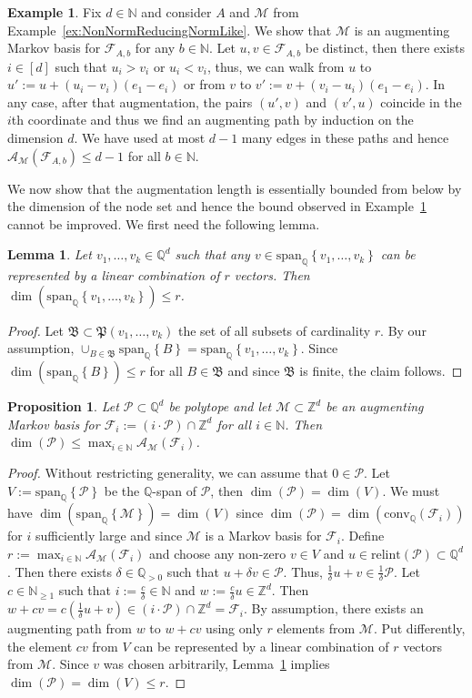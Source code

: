 \documentclass[11pt]{amsart}
\newtheorem{lemma}[thm]{Lemma}
\newtheorem{prop}[thm]{Proposition}
\theoremstyle{definition}
\newtheorem{example}[thm]{Example}
\numberwithin{equation}{section}
\newcommand{\ring}[1]{\ensuremath{\mathbb{#1}}}
\renewcommand{\>}{\rangle}
\newcommand{\<}{\langle}
\newcommand{\0}{\mathbf{0}}
\newcommand{\1}{\mathbf{1}}
\newcommand{\2}{\mathbf{2}}
\newcommand\NN{\ring{N}}
\newcommand\QQ{\ring{Q}}
\newcommand\ZZ{\ring{Z}}
\newcommand\cA{{\mathcal A}}
\newcommand\cF{{\mathcal F}}
\newcommand\cM{{\mathcal M}}
\newcommand\cP{{\mathcal P}}
\newcommand{\fiber}[2]{\mathcal{F}_{#1,#2}}
\newcommand{\auglen}[2]{\cA_{#1}(#2)}
\newcommand{\conv}[1]{\mathrm{conv}_\QQ(#1)}
\newcommand{\spannQQ}[1]{\mathrm{span}_\QQ\left\{#1\right\}}
\begin{document}
\begin{example}\label{ex:AugmentingMarkovBasis}
Fix $d\in\NN$ and consider $A$ and $\cM$ from
Example~\ref{ex:NonNormReducingNormLike}. We show that $\cM$ is an
augmenting Markov basis for $\fiber{A}{b}$ for any $b\in\NN$.
Let $u,v\in\fiber{A}{b}$ be distinct, then there exists $i\in[d]$ such
that $u_i>v_i$ or $u_i<v_i$, thus, we can walk from $u$ to
$u':=u+(u_i-v_i)(e_1-e_i)$ or from $v$ to $v':=v+(v_i-u_i)(e_1-e_i)$.
In any case, after that augmentation, the pairs $(u',v)$ and $(v',u)$
coincide in the $i$th coordinate and thus we find an augmenting path
by induction on the dimension $d$. We have used at most $d-1$ many
edges in these paths and hence $\auglen{\cM}{\fiber{A}{b}}\le d-1$ for
all $b\in\NN$.
\end{example}

We now show that the augmentation length is essentially bounded from
below by the dimension of the node set and hence the bound observed in
Example~\ref{ex:AugmentingMarkovBasis} cannot be improved. We first need the
following lemma.

\begin{lemma}\label{l:VectorSpace}
Let $v_1,\dots,v_k\in\QQ^d$ such that any
$v\in\spannQQ{v_1,\dots,v_k}$ can be represented by a linear
combination of $r$ vectors. Then
$\dim(\spannQQ{v_1,\dots,v_k})\le r$.
\end{lemma}
\begin{proof}
Let $\mathfrak{B}\subset\mathfrak{P}(v_1,\dots,v_k)$ the set of all
subsets of cardinality $r$. By our assumption,
$\cup_{B\in\mathfrak{B}}\spannQQ{B}=\spannQQ{v_1,\dots,v_k}$.
Since $\dim(\spannQQ{B})\le r$ for all $B\in\mathfrak{B}$ and
since $\mathfrak{B}$ is finite, the claim follows.
\end{proof}

\begin{prop}\label{p:AugmentingDilatation}
Let $\cP\subset\QQ^d$ be polytope and let $\cM\subset\ZZ^d$ be an
augmenting Markov basis for
$\cF_i:=(i\cdot\cP)\cap\ZZ^d$ for all $i\in\NN$. Then
$\dim(\cP)\le\max_{i\in\NN}\auglen{\cM}{\cF_i}$.
\end{prop}
\begin{proof}
Without restricting generality, we can assume that
$0\in\cP$. Let $V:=\spannQQ{\cP}$ be the $\QQ$-span of
$\cP$, then $\dim(\cP)=\dim(V)$. 
We must have $\dim(\spannQQ{\cM})=\dim(V)$ since 
$\dim(\cP)=\dim(\conv{\cF_i})$ for $i$ sufficiently large and since $\cM$ is a Markov basis
for $\cF_i$. Define $r:=\max_{i\in\NN}\auglen{\cM}{\cF_i}$
and choose any
non-zero $v\in V$ and $u\in\mathrm{relint}(\cP)\subset\QQ^d$. Then there exists
$\delta\in\QQ_{>0}$ such that $u+\delta v\in\cP$. Thus,
$\frac{1}{\delta}u+v\in\frac{1}{\delta}\cP$. Let $c\in\NN_{\ge 1}$
such that $i:=\frac{c}{\delta}\in\NN$ and 
$w:=\frac{c}{\delta}u\in\ZZ^d$. Then
$w+c
v=c(\frac{1}{\delta}u+v)\in(i\cdot\cP)\cap\ZZ^d=\cF_{i}$. By
assumption, there exists an augmenting path from $w$ to $w+c v$ using
only $r$ elements from $\cM$. Put differently, the element $c v$ from
$V$ can be represented by a linear combination of $r$ vectors from $\cM$.
Since $v$ was chosen arbitrarily, Lemma~\ref{l:VectorSpace} implies
$\dim(\cP)=\dim(V)\le r$.
\end{proof}
\end{document}
